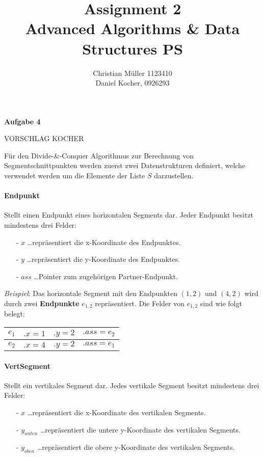 \documentclass{article}
\begin{document}
%
\title{Assignment 2 \\ Advanced Algorithms \& Data Structures PS}%
\author{Christian Müller 1123410 \\ Daniel Kocher, 0926293}%
\maketitle%
\clearpage%
%
{\noindent\bfseries Aufgabe 4}%

\medskip%

{\noindent\LARGE VORSCHLAG KOCHER}%

\medskip%
\noindent
F{\"u}r den Divide-\&-Conquer Algorithmus zur Berechnung von Segmentschnittpunkten
werden zuerst zwei Datenstrukturen definiert, welche verwendet werden um die
Elemente der Liste $S$ darzustellen.

\paragraph{Endpunkt}
Stellt einen Endpunkt eines horizontalen Segments dar.
Jeder Endpunkt besitzt mindestens drei Felder:
\begin{itemize}
  \item[-] $x$ \ldots repr{\"a}sentiert die x-Koordinate des Endpunktes.
  \item[-] $y$ \ldots repr{\"a}sentiert die y-Koordinate des Endpunktes.
  \item[-] $ass$ \ldots Pointer zum zugeh{\"o}rigen Partner-Endpunkt.
\end{itemize}

\emph{Beispiel}: Das horizontale Segment mit den Endpunkten $(1, 2)$ und $(4, 2)$ wird
durch zwei {\bfseries Endpunkte} $e_{1, 2}$ repr{\"a}sentiert. Die Felder von
$e_{1, 2}$ sind wie folgt belegt:

\begin{center}
\begin{tabular}{l||l|l|l|}
  \hline
  $e_1$ & $.x = 1$ & $.y = 2$ & $.ass = e_2$ \tabularnewline
  \hline
  $e_2$ & $.x = 4$ & $.y = 2$ & $.ass = e_1$ \tabularnewline
  \hline
\end{tabular}
\end{center}

\paragraph{VertSegment}
Stellt ein vertikales Segment dar. Jedes vertikale Segment besitzt mindestens
drei Felder:
\begin{itemize}
  \item[-] $x$ \ldots repr{\"a}sentiert die x-Koordinate des vertikalen Segments.
  \item[-] $y_{unten}$ \ldots repr{\"a}sentiert die untere y-Koordinate des
    vertikalen Segments.
  \item[-] $y_{oben}$ \ldots repr{\"a}sentiert die obere y-Koordinate des
    vertikalen Segments.
\end{itemize}
\end{document}
